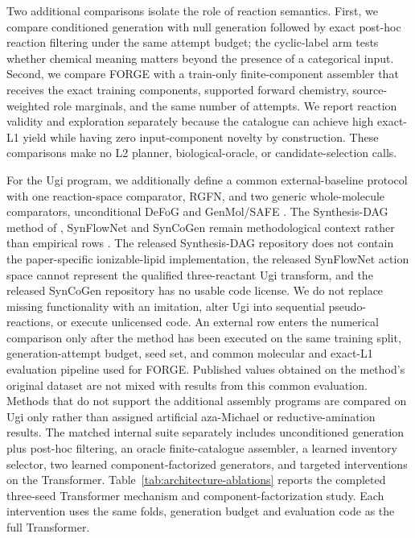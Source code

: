 \documentclass{article}
\begin{document}
Two additional comparisons isolate the role of reaction semantics.
First, we compare conditioned generation with null generation followed by exact post-hoc reaction
filtering under the same attempt budget; the cyclic-label arm tests whether chemical meaning matters
beyond the presence of a categorical input.
Second, we compare FORGE with a train-only finite-component assembler that receives the exact
training components, supported forward chemistry, source-weighted role marginals, and the same
number of attempts.
We report reaction validity and exploration separately because the catalogue can achieve high
exact-L1 yield while having zero input-component novelty by construction.
These comparisons make no L2 planner, biological-oracle, or candidate-selection calls.

For the Ugi program, we additionally define a common external-baseline protocol with one
reaction-space comparator, RGFN, and two generic whole-molecule comparators, unconditional DeFoG
and GenMol/SAFE \citep{koziarski2024rgfn,qin2025defog,lee2025genmol}.
The Synthesis-DAG method of \citet{ou2024deep}, SynFlowNet and SynCoGen remain methodological
context rather than empirical rows \citep{cretu2025synflownet,rekesh2026syncogen}.
The released Synthesis-DAG repository does not contain the paper-specific ionizable-lipid
implementation, the released SynFlowNet action space cannot represent the qualified
three-reactant Ugi transform, and the released SynCoGen repository has no usable code license.
We do not replace missing functionality with an imitation, alter Ugi into sequential
pseudo-reactions, or execute unlicensed code.
An external row enters the numerical comparison only after the method has been executed on the
same training split, generation-attempt budget, seed set, and common molecular and exact-L1
evaluation pipeline used for FORGE.
Published values obtained on the method's original dataset are not mixed with results from this
common evaluation.
Methods that do not support the additional assembly programs are compared on Ugi only rather than
assigned artificial aza-Michael or reductive-amination results.
The matched internal suite separately includes unconditioned generation plus post-hoc filtering, an
oracle finite-catalogue assembler, a learned inventory selector, two learned component-factorized
generators, and targeted interventions on the Transformer. Table~\ref{tab:architecture-ablations}
reports the completed three-seed Transformer mechanism and component-factorization study. Each
intervention uses the same folds, generation budget and evaluation code as the full Transformer.
\end{document}
